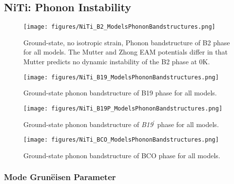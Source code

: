 \documentclass[preprint,colorlinks=true,linkcolor=black,citecolor=black]{elsarticle}
\begin{document}
\subsection{NiTi: Phonon Instability}
\label{subsec:nitiphonons}

\begin{figure}[!htp]
	\begin{centering}
		\texttt{[image: figures/NiTi\_B2\_ModelsPhononBandstructures.png]}
		\caption{ Ground-state, no isotropic strain, Phonon bandstructure
			of B2 phase for all models. The Mutter and Zhong EAM potentials
			differ in that Mutter predicts no dynamic instability of the B2
			phase at 0K.  }
		\label{fig:allmodels_b2}
	\end{centering}
\end{figure}

\begin{figure}[!htp]
	\begin{centering}
		\texttt{[image: figures/NiTi\_B19\_ModelsPhononBandstructures.png]}
		\caption{ Ground-state phonon bandstructure of B19 phase for all
			models.  }
		\label{fig:allmodels_B19P}
	\end{centering}
\end{figure}

\begin{figure}[!htp]
	\begin{centering}
		\texttt{[image: figures/NiTi\_B19P\_ModelsPhononBandstructures.png]}
		\caption{ Ground-state phonon bandstructure of
			\textit{B19}$^\prime$ phase for all models.  }
		\label{fig:allmodels_B19P}
	\end{centering}
\end{figure}

\begin{figure}[!htp]
	\begin{centering}
		\texttt{[image: figures/NiTi\_BCO\_ModelsPhononBandstructures.png]}
		\caption{ Ground-state phonon bandstructure of BCO phase for all
			models.  }
		\label{fig:allmodels_B19P}
	\end{centering}
\end{figure}

\subsubsection{Mode Grun\"{e}isen Parameter}
\end{document}
